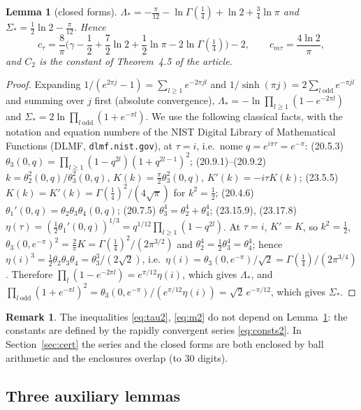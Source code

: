\documentclass[11pt,a4paper]{article}
\theoremstyle{plain}
\newtheorem{lemma}[theorem]{Lemma}
\theoremstyle{definition}
\newtheorem{remark}[theorem]{Remark}
\numberwithin{equation}{section}
\begin{document}
\begin{lemma}[closed forms]\label{lem:closed}
$\Lambda_*=-\frac\pi{12}-\ln\Gamma(\tfrac14)+\ln2+\tfrac34\ln\pi$ and $\Sigma_*=\tfrac12\ln2-\tfrac\pi{12}$. Hence
\[
c_\tau=\frac8\pi\Big(\gamma-\frac12+\frac72\ln2+\frac12\ln\pi-2\ln\Gamma(\tfrac14)\Big)-2,\qquad c_{m\tau}=\frac{4\ln2}{\pi},
\]
and $C_2$ is the constant of Theorem~4.5 of the article.
\end{lemma}
\begin{proof}
Expanding $1/(e^{2\pi j}-1)=\sum_{l\ge1}e^{-2\pi jl}$ and $1/\sinh(\pi j)=2\sum_{l\ \mathrm{odd}}e^{-\pi jl}$ and summing over $j$ first (absolute convergence),
$\Lambda_*=-\ln\prod_{l\ge1}(1-e^{-2\pi l})$ and $\Sigma_*=2\ln\prod_{l\ \mathrm{odd}}(1+e^{-\pi l})$.
We use the following classical facts, with the notation and equation numbers of the NIST Digital Library of Mathematical Functions (DLMF, \texttt{dlmf.nist.gov}), at $\tau=i$, i.e.\ nome $q=e^{i\pi\tau}=e^{-\pi}$:
(20.5.3) $\theta_3(0,q)=\prod_{l\ge1}(1-q^{2l})(1+q^{2l-1})^2$;
(20.9.1)--(20.9.2) $k=\theta_2^2(0,q)/\theta_3^2(0,q)$, $K(k)=\frac\pi2\theta_3^2(0,q)$, $K'(k)=-i\tau K(k)$;
(23.5.5) $K(k)=K'(k)=\Gamma(\frac14)^2/(4\sqrt\pi)$ for $k^2=\frac12$;
(20.4.6) $\theta_1'(0,q)=\theta_2\theta_3\theta_4(0,q)$; (20.7.5) $\theta_3^4=\theta_2^4+\theta_4^4$;
(23.15.9), (23.17.8) $\eta(\tau)=(\frac12\theta_1'(0,q))^{1/3}=q^{1/12}\prod_{l\ge1}(1-q^{2l})$.
At $\tau=i$, $K'=K$, so $k^2=\frac12$, $\theta_3(0,e^{-\pi})^2=\frac2\pi K=\Gamma(\frac14)^2/(2\pi^{3/2})$ and $\theta_2^4=\frac12\theta_3^4=\theta_4^4$; hence $\eta(i)^3=\frac12\theta_2\theta_3\theta_4=\theta_3^3/(2\sqrt2)$, i.e.\ $\eta(i)=\theta_3(0,e^{-\pi})/\sqrt2=\Gamma(\frac14)/(2\pi^{3/4})$. Therefore
$\prod_{l}(1-e^{-2\pi l})=e^{\pi/12}\eta(i)$, which gives $\Lambda_*$, and $\prod_{l\ \mathrm{odd}}(1+e^{-\pi l})^2=\theta_3(0,e^{-\pi})/(e^{\pi/12}\eta(i))=\sqrt2\,e^{-\pi/12}$, which gives $\Sigma_*$.
\end{proof}
\begin{remark}
The inequalities \eqref{eq:tau2}, \eqref{eq:m2} do not depend on Lemma~\ref{lem:closed}: the constants are defined by the rapidly convergent series \eqref{eq:consts2}. In Section~\ref{sec:cert} the series and the closed forms are both enclosed by ball arithmetic and the enclosures overlap (to 30 digits).
\end{remark}

\subsection{Three auxiliary lemmas}
\end{document}
